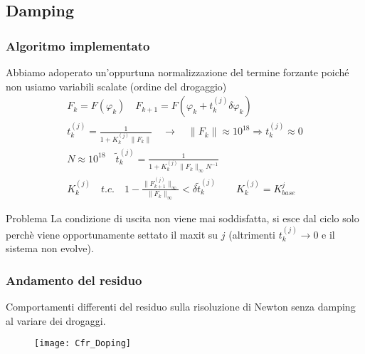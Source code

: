 \subsection{Damping}
\begin{frame}
\tableofcontents[currentsection]
\end{frame}

\begin{frame}
\frametitle{Algoritmo implementato}
\begin{center}
Abbiamo adoperato un'oppurtuna normalizzazione del termine forzante poich\'e non usiamo variabili scalate (ordine del drogaggio)
\begin{equation*}
\begin{array}{l}
F_k = F(\varphi_k) \quad F_{k+1}=F(\varphi_k+t_k^{(j)}\delta\varphi_k) 
 \\  
t_k^{(j)}=\frac{1}{1+K_k^{(j)}\parallel F_k\parallel}  
\quad \longrightarrow \quad \parallel F_k\parallel \approx 10^{18}\Longrightarrow t_k^{(j)} \approx 0
\\  
N\approx 10^{18} \quad \tilde{t}_k^{(j)}=\frac{1}{1+K_k^{(j)}\parallel F_k\parallel_\infty N^{-1}}  
\\ 
K_k^{(j)} \quad t.c. \quad
1-\frac{\parallel F_{k+1}^{(j)} \parallel_\infty}{  \parallel F_{k} \parallel_\infty }< \delta \tilde{t}_k^{(j)} \quad\quad K_k^{(j)} = K_{base}^j
\end{array}
\end{equation*}
\begin{alertblock}{Problema}
La condizione di uscita non viene mai soddisfatta, si esce dal ciclo solo perch\`e viene opportunamente settato il maxit su $j$ (altrimenti $t_k^{(j)}\rightarrow 0$ e il sistema non evolve).
\end{alertblock}
\end{center}
\end{frame}

\begin{frame}
\frametitle{Andamento del residuo}
Comportamenti differenti del residuo sulla risoluzione di Newton senza damping al variare dei drogaggi.
\begin{center}
\begin{figure}[!h]
          {\texttt{[image: Cfr\_Doping]}}

\end{figure}
\end{center}


\end{frame}

